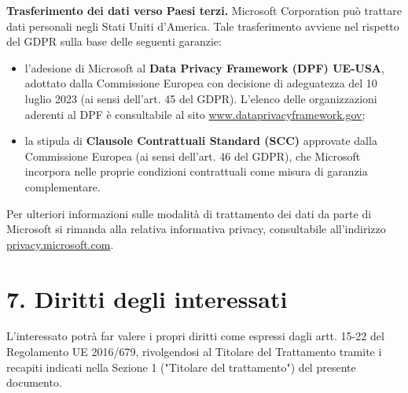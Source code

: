 \documentclass[11pt, a4paper]{article}
\begin{document}
\textbf{Trasferimento dei dati verso Paesi terzi.} Microsoft Corporation può trattare dati personali negli Stati Uniti d'America. Tale trasferimento avviene nel rispetto del GDPR sulla base delle seguenti garanzie:
\begin{itemize}
    \item l'adesione di Microsoft al \textbf{Data Privacy Framework (DPF) UE-USA}, adottato dalla Commissione Europea con decisione di adeguatezza del 10 luglio 2023 (ai sensi dell'art. 45 del GDPR). L'elenco delle organizzazioni aderenti al DPF è consultabile al sito \href{https://www.dataprivacyframework.gov}{www.dataprivacyframework.gov};
    \item la stipula di \textbf{Clausole Contrattuali Standard (SCC)} approvate dalla Commissione Europea (ai sensi dell'art. 46 del GDPR), che Microsoft incorpora nelle proprie condizioni contrattuali come misura di garanzia complementare.
\end{itemize}
Per ulteriori informazioni sulle modalità di trattamento dei dati da parte di Microsoft si rimanda alla relativa informativa privacy, consultabile all'indirizzo \href{https://privacy.microsoft.com}{privacy.microsoft.com}.

\section*{7. Diritti degli interessati}

L'interessato potrà far valere i propri diritti come espressi dagli artt. 15-22 del Regolamento UE 2016/679, rivolgendosi al Titolare del Trattamento tramite i recapiti indicati nella Sezione 1 ("Titolare del trattamento") del presente documento.
\end{document}
